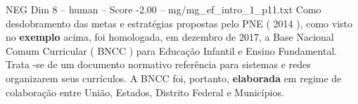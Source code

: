 \begin{textsample}{NEG Dim 8 – human – Score -2.00 – mg/mg\_ef\_intro\_1\_p11.txt}  \label{ex:f8_neg_008}
Como desdobramento das metas e estratégias propostas pelo PNE ( 2014 ), como visto no \textbf{exemplo} acima, foi homologada, em dezembro de 2017, a Base Nacional Comum Curricular ( BNCC ) para Educação Infantil e Ensino Fundamental.
Trata -se de um documento normativo referência para sistemas e redes organizarem seus currículos.
A BNCC foi, portanto, \textbf{elaborada} em regime de colaboração entre União, Estados, Distrito Federal e Municípios.

\end{textsample}
